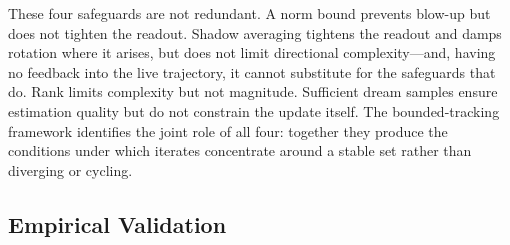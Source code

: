 \documentclass[11pt]{article}
\begin{document}
These four safeguards are not redundant. A norm bound prevents blow-up but does not tighten the readout. Shadow averaging tightens the readout and damps rotation where it arises, but does not limit directional complexity---and, having no feedback into the live trajectory, it cannot substitute for the safeguards that do. Rank limits complexity but not magnitude. Sufficient dream samples ensure estimation quality but do not constrain the update itself. The bounded-tracking framework identifies the joint role of all four: together they produce the conditions under which iterates concentrate around a stable set rather than diverging or cycling.

\subsection{Empirical Validation}
\end{document}
